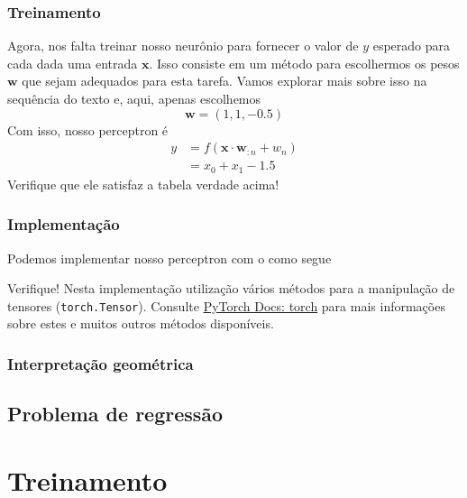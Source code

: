     
\subsubsection{Treinamento}

Agora, nos falta treinar nosso neurônio para fornecer o valor de $y$ esperado para cada dada uma entrada $\pmb{x}$. Isso consiste em um método para escolhermos os pesos $\pmb{w}$ que sejam adequados para esta tarefa. Vamos explorar mais sobre isso na sequência do texto e, aqui, apenas escolhemos
\begin{equation}
  \pmb{w} = (1, 1, -0.5)
\end{equation}
Com isso, nosso perceptron é
\begin{align}
  y &= f(\pmb{x}\cdot\pmb{w}_{:n} + w_n)\\
    &= x_0 + x_1 - 1.5
\end{align}
Verifique que ele satisfaz a tabela verdade acima!

\subsubsection{Implementação}

\ifispython
Podemos implementar nosso perceptron com o {\pytorch} como segue



Verifique! Nesta implementação utilização vários métodos para a manipulação de tensores (\lstinline+torch.Tensor+). Consulte \href{https://pytorch.org/docs/stable/torch.html}{PyTorch Docs: torch} para mais informações sobre estes e muitos outros métodos disponíveis.
\fi

\subsubsection{Interpretação geométrica}

\emconstrucao

\subsection{Problema de regressão}

\emconstrucao

\section{Treinamento}

\emconstrucao
